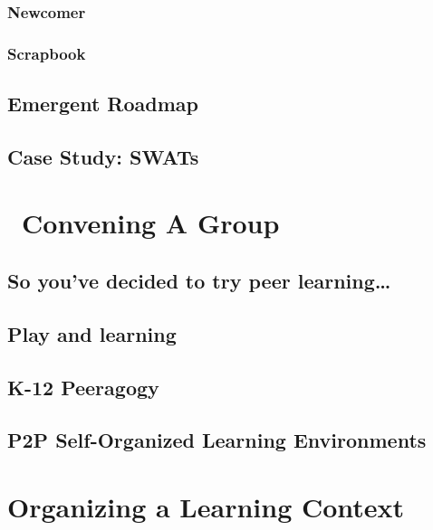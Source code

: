 \documentclass[ebook, 12pt, twoside]{memoir}
\begin{document}
\section*{Newcomer} \label{sec:Newcomer}

%
\section*{Scrapbook} \label{sec:Scrapbook}


\chapter{Emergent Roadmap} \label{sec:Distributed_Roadmap}
 

\renewcommand*{\footnote}[1]{\oldfootnote{#1}}%
\renewcommand*{\textsuperscript}[1]{\oldtextsuperscript{#1}}%

\chapter{Case Study: SWATs} \label{swats}


\part{~Convening A Group} \label{convening-part} %
%
\chapter[\textbf{So you've decided to try peer learning\ldots}]{So you've decided to try peer learning\ldots}

%
\chapter[\textbf{Play and learning}]{Play and learning}
%

%
\chapter[\textbf{K-12 Peeragogy}]{K-12 Peeragogy}
%

%
\chapter[\textbf{P2P SOLE}]{P2P Self-Organized Learning Environments}
%

%

\part{Organizing a Learning Context} \label{organizing-part} %
%
\end{document}
